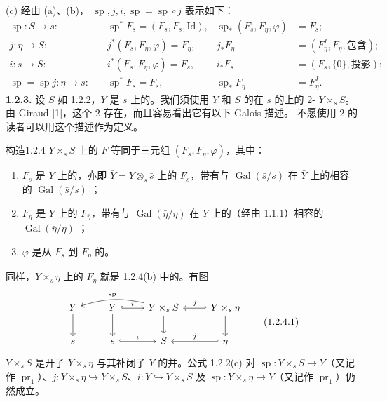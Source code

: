 (c) 经由 (a)、(b)， $\operatorname{sp},j,i,\operatorname{sp}=\operatorname{sp}\circ j$ 表示如下：
\[
\begin{aligned}
\operatorname{sp}:S\to s:&\quad\operatorname{sp}^*F_{\bar s}=(F_{\bar s},F_{\bar s},\mathrm{Id}),&\operatorname{sp}_*(F_{\bar s},F_{\bar\eta},\varphi)&=F_{\bar s};\\
j:\eta\to S:&\quad j^*(F_{\bar s},F_{\bar\eta},\varphi)=F_{\bar\eta},&j_*F_{\bar\eta}&=(F_{\bar\eta}^{I},F_{\bar\eta},\text{包含});\\
i:s\to S:&\quad i^*(F_{\bar s},F_{\bar\eta},\varphi)=F_{\bar s},&i_*F_{\bar s}&=(F_{\bar s},\{0\},\text{投影});\\
\operatorname{sp}=\operatorname{sp}j:\eta\to s:&\quad\operatorname{sp}^*F_{\bar s}=F_{\bar s},&\operatorname{sp}_*F_{\bar\eta}&=F_{\bar\eta}^{I}.
\end{aligned}
\]
\textbf{1.2.3.} 设 $S$ 如 1.2.2，$Y$ 是 $s$ 上的。我们须使用 $Y$ 和 $S$ 的在 $s$ 的上的 $2$- $Y\times_sS$。由 Giraud [1]，这个 $2$-存在，而且容易看出它有以下 Galois 描述。
不愿使用 $2$-的读者可以用这个描述作为定义。
\begin{SGAresult}{构造}{1.2.4}
$Y\times_sS$ 上的 $F$ 等同于三元组 $(F_s,F_\eta,\varphi)$，其中：
\begin{enumerate}
\item[(a)] $F_s$ 是 $Y$ 上的，亦即 $\bar Y=Y\otimes_s\bar s$ 上的 $F_{\bar s}$，带有与 $\operatorname{Gal}(\bar s/s)$ 在 $\bar Y$ 上的相容的 $\operatorname{Gal}(\bar s/s)$ ；
\item[(b)] $F_\eta$ 是 $\bar Y$ 上的 $F_{\bar\eta}$，带有与 $\operatorname{Gal}(\bar\eta/\eta)$ 在 $\bar Y$ 上的（经由 1.1.1）相容的 $\operatorname{Gal}(\bar\eta/\eta)$ ；
\item[(c)] $\varphi$ 是从 $F_{\bar s}$ 到 $F_{\bar\eta}$ 的。
\end{enumerate}
\end{SGAresult}
同样，$Y\times_s\eta$ 上的 $F_\eta$ 就是 1.2.4(b) 中的。有图
\[
\begin{tikzcd}
Y\arrow[d]&Y\arrow[d]\arrow[r,hook,"i"]&Y\times_sS\arrow[d]\arrow[ll,"\operatorname{sp}"',bend right=15]&Y\times_s\eta\arrow[l,hook',"j"']\arrow[d]\\
s&s\arrow[r,hook,"i"]&S&\eta\arrow[l,hook',"j"']
\end{tikzcd}\tag{1.2.4.1}
\]
$Y\times_sS$ 是开子 $Y\times_s\eta$ 与其补闭子 $Y$ 的并。公式 1.2.2(c) 对 $\operatorname{sp}:Y\times_sS\to Y$（又记作 $\operatorname{pr}_1$）、$j:Y\times_s\eta\hookrightarrow Y\times_sS$、$i:Y\hookrightarrow Y\times_sS$ 及 $\operatorname{sp}:Y\times_s\eta\to Y$（又记作 $\operatorname{pr}_1$）仍然成立。

